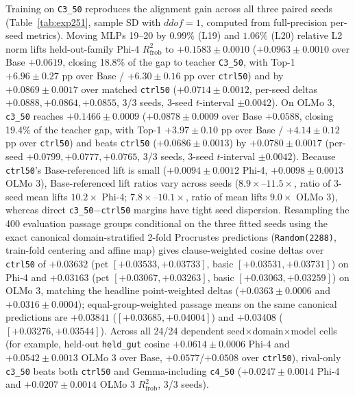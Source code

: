 \documentclass[conference]{IEEEtran}
\begin{document}
Training on \texttt{C3\_50} reproduces the alignment gain across all three paired seeds (Table~\ref{tab:exp251}, sample SD with $ddof=1$, computed from full-precision per-seed metrics). Moving MLPs 19--20 by $0.99\%$ (L19) and $1.06\%$ (L20) relative L2 norm lifts held-out-family Phi-4 $R^2_{\text{frob}}$ to $+0.1583\pm0.0010$ ($+0.0963\pm0.0010$ over Base $+0.0619$, closing 18.8\% of the gap to teacher \texttt{C3\_50}, with Top-1 $+6.96\pm0.27$ pp over Base / $+6.30\pm0.16$ pp over \texttt{ctrl50}) and by \textbf{$+0.0869\pm0.0017$} over matched \texttt{ctrl50} ($+0.0714\pm0.0012$, per-seed deltas $+0.0888, +0.0864, +0.0855$, 3/3 seeds, 3-seed $t$-interval $\pm0.0042$). On OLMo 3, \texttt{c3\_50} reaches $+0.1466\pm0.0009$ ($+0.0878\pm0.0009$ over Base $+0.0588$, closing 19.4\% of the teacher gap, with Top-1 $+3.97\pm0.10$ pp over Base / $+4.14\pm0.12$ pp over \texttt{ctrl50}) and beats \texttt{ctrl50} ($+0.0686\pm0.0013$) by \textbf{$+0.0780\pm0.0017$} (per-seed $+0.0799, +0.0777, +0.0765$, 3/3 seeds, 3-seed $t$-interval $\pm0.0042$). Because \texttt{ctrl50}'s Base-referenced lift is small ($+0.0094\pm0.0012$ Phi-4, $+0.0098\pm0.0013$ OLMo 3), Base-referenced lift ratios vary across seeds ($8.9\times$--$11.5\times$, ratio of 3-seed mean lifts $10.2\times$ Phi-4; $7.8\times$--$10.1\times$, ratio of mean lifts $9.0\times$ OLMo 3), whereas direct \texttt{c3\_50}$-$\texttt{ctrl50} margins have tight seed dispersion. Resampling the 400 evaluation passage groups conditional on the three fitted seeds using the exact canonical domain-stratified 2-fold Procrustes predictions (\texttt{Random(2288)}, train-fold centering and affine map) gives clause-weighted cosine deltas over \texttt{ctrl50} of $+0.03632$ (pct $[+0.03533, +0.03733]$, basic $[+0.03531, +0.03731]$) on Phi-4 and $+0.03163$ (pct $[+0.03067, +0.03263]$, basic $[+0.03063, +0.03259]$) on OLMo 3, matching the headline point-weighted deltas ($+0.0363\pm0.0006$ and $+0.0316\pm0.0004$); equal-group-weighted passage means on the same canonical predictions are $+0.03841$ ($[+0.03685, +0.04004]$) and $+0.03408$ ($[+0.03276, +0.03544]$). Across all 24/24 dependent seed$\times$domain$\times$model cells (for example, held-out \texttt{held\_gut} cosine $+0.0614\pm0.0006$ Phi-4 and $+0.0542\pm0.0013$ OLMo 3 over Base, $+0.0577$/$+0.0508$ over \texttt{ctrl50}), rival-only \texttt{c3\_50} beats both \texttt{ctrl50} and Gemma-including \texttt{c4\_50} ($+0.0247\pm0.0014$ Phi-4 and $+0.0207\pm0.0014$ OLMo 3 $R^2_{\text{frob}}$, 3/3 seeds).
\end{document}
